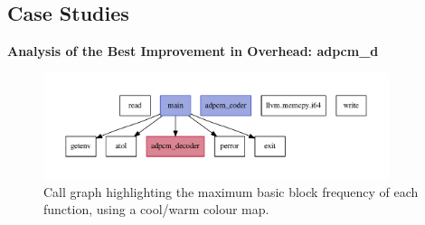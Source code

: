 


\subsection{Case Studies}

\noindent \textbf{Analysis of the Best Improvement in Overhead: {\flagstype adpcm\_d}}

\begin{figure}[htb]
    \centering
    \includegraphics[width=0.9\textwidth]{figs/adpcm_d-heat-callgraph.pdf}
    \caption{Call graph highlighting the maximum basic block frequency of each function, using a cool/warm colour map.}
    \label{fig:adpcm_d-heat-callgraph}
\end{figure}

